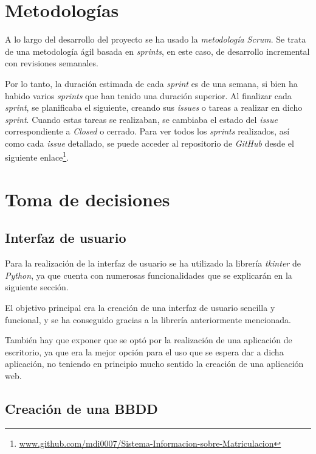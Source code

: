  
\section{Metodologías}\label{metodologias}

A lo largo del desarrollo del proyecto se ha usado la \emph{metodología Scrum}. Se trata de una metodología ágil basada en \emph{sprints}, en este caso, de desarrollo incremental con revisiones semanales.

Por lo tanto, la duración estimada de cada \emph{sprint} es de una semana, si bien ha habido varios \emph{sprints} que han tenido una duración superior. Al finalizar cada \emph{sprint}, se planificaba el siguiente, creando sus \emph{issues} o tareas a realizar en dicho \emph{sprint}. Cuando estas tareas se realizaban, se cambiaba el estado del \emph{issue} correspondiente a \emph{Closed} o cerrado.  
Para ver todos los \emph{sprints} realizados, así como cada \emph{issue} detallado, se puede acceder al repositorio de \emph{GitHub} desde el siguiente enlace\footnote{\href {https://github.com/mdi0007/Sistema-Informacion-sobre-Matriculacion}{www.github.com/mdi0007/Sistema-Informacion-sobre-Matriculacion}}. 

\section{Toma de decisiones}\label{toma_de_decisiones}

\subsection{Interfaz de usuario}

Para la realización de la interfaz de usuario se ha utilizado la librería \emph{tkinter} de \emph{Python}, ya que cuenta con numerosas funcionalidades que se explicarán en la siguiente sección.

El objetivo principal era la creación de una interfaz de usuario sencilla y funcional, y se ha conseguido gracias a la librería anteriormente mencionada. 

También hay que exponer que se optó por la realización de una aplicación de escritorio, ya que era la mejor opción para el uso que se espera dar a dicha aplicación, no teniendo en principio mucho sentido la creación de una aplicación web. 



\subsection{Creación de una BBDD}

